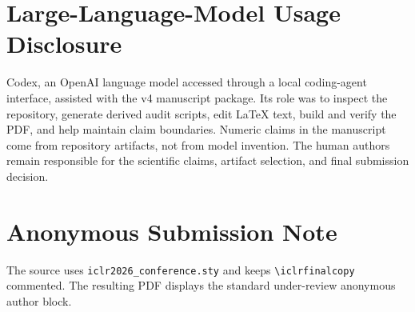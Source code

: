 \documentclass{article}
\begin{document}
\section{Large-Language-Model Usage Disclosure}
\label{app:llm}

Codex, an OpenAI language model accessed through a local coding-agent
interface, assisted with the v4 manuscript package. Its role was to inspect the
repository, generate derived audit scripts, edit LaTeX text, build and verify
the PDF, and help maintain claim boundaries. Numeric claims in the manuscript
come from repository artifacts, not from model invention. The human authors
remain responsible for the scientific claims, artifact selection, and final
submission decision.

\section{Anonymous Submission Note}

The source uses \texttt{iclr2026\_conference.sty} and keeps
\texttt{\textbackslash iclrfinalcopy} commented. The resulting PDF displays the
standard under-review anonymous author block.
\end{document}
